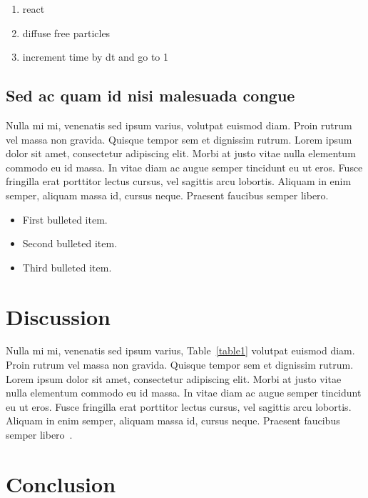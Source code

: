 \documentclass[10pt,letterpaper]{article}
\begin{document}
\begin{enumerate}
	\item{react}
	\item{diffuse free particles}
	\item{increment time by dt and go to 1}
\end{enumerate}


\subsection*{Sed ac quam id nisi malesuada congue}

Nulla mi mi, venenatis sed ipsum varius, volutpat euismod diam. Proin rutrum vel massa non gravida. Quisque tempor sem et dignissim rutrum. Lorem ipsum dolor sit amet, consectetur adipiscing elit. Morbi at justo vitae nulla elementum commodo eu id massa. In vitae diam ac augue semper tincidunt eu ut eros. Fusce fringilla erat porttitor lectus cursus, vel sagittis arcu lobortis. Aliquam in enim semper, aliquam massa id, cursus neque. Praesent faucibus semper libero.

\begin{itemize}
	\item First bulleted item.
	\item Second bulleted item.
	\item Third bulleted item.
\end{itemize}

\section*{Discussion}
Nulla mi mi, venenatis sed ipsum varius, Table~\ref{table1} volutpat euismod diam. Proin rutrum vel massa non gravida. Quisque tempor sem et dignissim rutrum. Lorem ipsum dolor sit amet, consectetur adipiscing elit. Morbi at justo vitae nulla elementum commodo eu id massa. In vitae diam ac augue semper tincidunt eu ut eros. Fusce fringilla erat porttitor lectus cursus, vel sagittis arcu lobortis. Aliquam in enim semper, aliquam massa id, cursus neque. Praesent faucibus semper libero~\cite{bib3}.

\section*{Conclusion}

\end{document}
